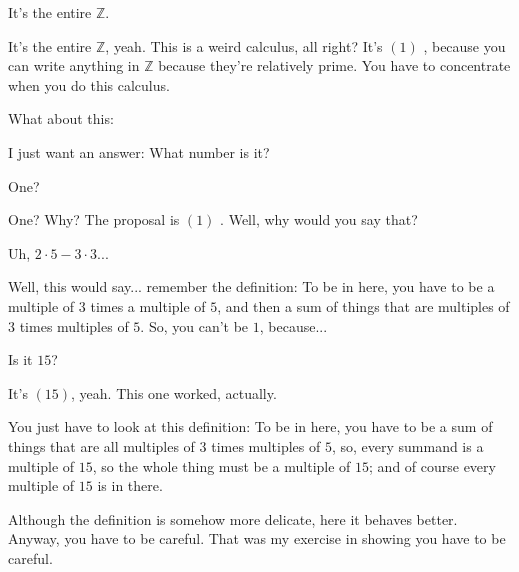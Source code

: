 \begin{student}
It's the entire $\mathbb{Z}$.
\end{student}

\begin{speech}[01:14:52 - 01:15:31]
It's the entire $\mathbb{Z}$, yeah. This is a weird calculus, all right? It's $(1)$ , because you can write anything in $\mathbb{Z}$ because they're relatively prime. You have to concentrate when you do this calculus.

What about this: 

I just want an answer: What number is it? 
\end{speech}

\begin{student}
One?
\end{student}

\begin{speech}[01:15:33 - 01:15:40]
One? Why? The proposal is $(1)$ . Well, why would you say that?
\end{speech}

\begin{student}
Uh, $2 \cdot 5 - 3 \cdot 3$...
\end{student}

\begin{speech}[01:15:45 - 01:16:00]
Well, this would say... remember the definition: To be in here, you have to be a multiple of $3$ times a multiple of $5$, and then a sum of things that are multiples of $3$ times multiples of $5$. So, you can't be $1$, because...
\end{speech}

\begin{student}
Is it $15$?
\end{student}

\begin{speech}[01:16:02 - 01:16:29]
It's $(15)$, yeah. This one worked, actually. 

You just have to look at this definition: To be in here, you have to be a sum of things that are all multiples of $3$ times multiples of $5$, so, every summand is a multiple of $15$, so the whole thing must be a multiple of $15$; and of course every multiple of $15$ is in there.

Although the definition is somehow more delicate, here it behaves better. Anyway, you have to be careful. That was my exercise in showing you have to be careful.
\end{speech}

